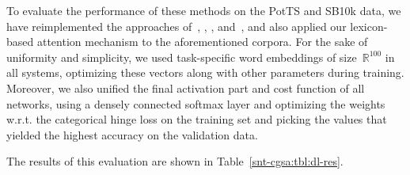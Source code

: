 

To evaluate the performance of these methods on the PotTS and SB10k
data, we have reimplemented the approaches of~\citet{Yessenalina:11},
\citet{Socher:11,Socher:12,Socher:13}, \citet{Severyn:15},
and~\citet{Baziotis:17}, and also applied our lexicon-based attention
mechanism to the aforementioned corpora.  For the sake of uniformity
and simplicity, we used task-specific word embeddings of
size~$\mathbb{R}^{100}$ in all systems, optimizing these vectors along
with other parameters during training.  Moreover, we also unified the
final activation part and cost function of all networks, using a
densely connected softmax layer and optimizing the weights w.r.t. the
categorical hinge loss on the training set and picking the values that
yielded the highest accuracy on the validation data.

The results of this evaluation are shown in
Table~\ref{snt-cgsa:tbl:dl-res}.

